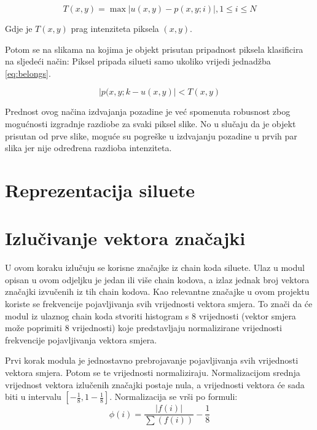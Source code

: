 \documentclass[times, utf8, diplomski]{fer}
\begin{document}
\begin{equation}
T(x,y) = \max{ \big|u(x,y) - p(x,y;i)\big|}, 1 \leq i \leq N
\end{equation}

Gdje je $T(x,y)$ prag intenziteta piksela $(x,y)$.

Potom se na slikama na kojima je objekt prisutan pripadnost piksela klasificira na sljedeći način:
Piksel pripada silueti samo ukoliko vrijedi jednadžba \ref{eq:belongs}.

\begin{equation} \label{eq:belongs}
\big|p(x,y;k - u(x,y)\big| < T(x,y)
\end{equation}
      
Prednost ovog načina izdvajanja pozadine je već spomenuta robusnost zbog mogućnosti izgradnje razdiobe za svaki piksel slike. No u slučaju da je objekt prisutan od prve slike, moguće su pogreške u izdvajanju pozadine u prvih par slika jer nije određrena razdioba intenziteta.


\section{Reprezentacija siluete}

\section{Izlučivanje vektora značajki}
\label{sec:silextraction}

U ovom koraku izlučuju se korisne značajke iz chain koda siluete. Ulaz u modul opisan u ovom odjeljku je jedan ili više chain kodova, a izlaz jednak broj vektora značajki izvučenih iz tih chain kodova. Kao relevantne značajke u ovom projektu koriste se frekvencije pojavljivanja svih vrijednosti vektora smjera. To znači da će modul iz ulaznog chain koda stvoriti histogram s 8 vrijednosti (vektor smjera može poprimiti 8 vrijednosti) koje predstavljaju normalizirane vrijednosti frekvencije pojavljivanja vektora smjera.

Prvi korak modula je jednostavno prebrojavanje pojavljivanja svih vrijednosti vektora smjera. Potom se te vrijednosti normaliziraju. Normalizacijom srednja vrijednost vektora izlučenih značajki postaje nula, a vrijednosti vektora će sada biti u intervalu $ [- \frac{1}{8} , 1- \frac{1}{8} ] $. Normalizacija se vrši po formuli:
\begin{equation}
\phi(i) = \frac{|f(i)|}{\sum(f(i))} - \frac{1}{8}
\end{equation}
\end{document}
